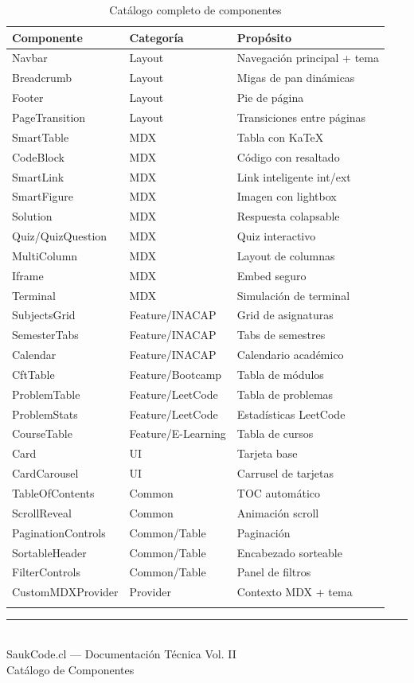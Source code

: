 \documentclass[12pt,a4paper]{article}
\begin{document}
\begin{longtable}{lll}
\toprule
\textbf{Componente} & \textbf{Categoría} & \textbf{Propósito} \\
\midrule
\endhead
Navbar & Layout & Navegación principal + tema \\
Breadcrumb & Layout & Migas de pan dinámicas \\
Footer & Layout & Pie de página \\
PageTransition & Layout & Transiciones entre páginas \\
SmartTable & MDX & Tabla con KaTeX \\
CodeBlock & MDX & Código con resaltado \\
SmartLink & MDX & Link inteligente int/ext \\
SmartFigure & MDX & Imagen con lightbox \\
Solution & MDX & Respuesta colapsable \\
Quiz/QuizQuestion & MDX & Quiz interactivo \\
MultiColumn & MDX & Layout de columnas \\
Iframe & MDX & Embed seguro \\
Terminal & MDX & Simulación de terminal \\
SubjectsGrid & Feature/INACAP & Grid de asignaturas \\
SemesterTabs & Feature/INACAP & Tabs de semestres \\
Calendar & Feature/INACAP & Calendario académico \\
CftTable & Feature/Bootcamp & Tabla de módulos \\
ProblemTable & Feature/LeetCode & Tabla de problemas \\
ProblemStats & Feature/LeetCode & Estadísticas LeetCode \\
CourseTable & Feature/E-Learning & Tabla de cursos \\
Card & UI & Tarjeta base \\
CardCarousel & UI & Carrusel de tarjetas \\
TableOfContents & Common & TOC automático \\
ScrollReveal & Common & Animación scroll \\
PaginationControls & Common/Table & Paginación \\
SortableHeader & Common/Table & Encabezado sorteable \\
FilterControls & Common/Table & Panel de filtros \\
CustomMDXProvider & Provider & Contexto MDX + tema \\
\bottomrule
\caption{Catálogo completo de componentes}
\end{longtable}

\vspace{1cm}
\begin{center}
\rule{8cm}{0.4pt}\\[0.3cm]
{\small\color{codegray} SaukCode.cl --- Documentación Técnica Vol. II\\
Catálogo de Componentes}
\end{center}
\end{document}
